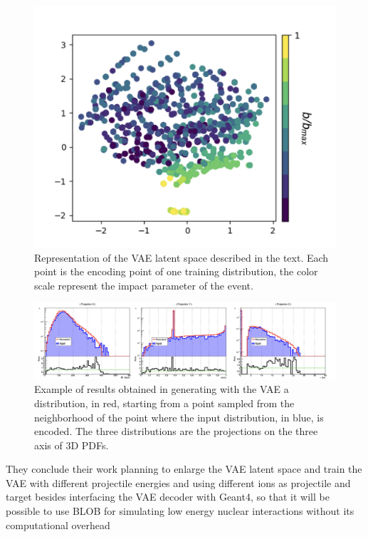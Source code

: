 \begin{figure}[!bht]
\centering
\includegraphics [width=.7\textwidth]{images/latent3}    
\caption{Representation of the VAE latent space described in the text. Each point is the encoding point of one training distribution, the color scale represent the impact parameter of the event.}
\label{fig:latent}
\end{figure}

\begin{figure}[!bht]
\centering
\includegraphics [width=\textwidth]{images/generated}
\caption{Example of results obtained in generating with the VAE a distribution, in red, starting from a point sampled from the neighborhood of the point where the input distribution, in blue, is encoded. The three distributions are the projections on the three axis of 3D PDFs.}
\label{fig:out}
\end{figure}

They conclude their work planning to enlarge the VAE latent space and train the VAE with different projectile energies and using different ions as projectile and target besides interfacing the VAE decoder with Geant4,
 so that it will be possible to use BLOB
 for simulating low energy nuclear interactions without its computational overhead


